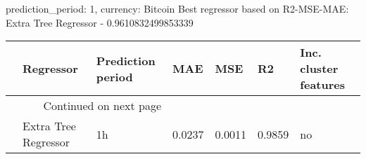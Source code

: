 
prediction_period: 1, currency: Bitcoin
Best regressor based on R2-MSE-MAE: Extra Tree Regressor - 0.9610832499853339
\begin{longtable}{lllllll}
\toprule
{} &             Regressor & Prediction period &     MAE &     MSE &      R2 & Inc. cluster features \\
\midrule
\endhead
\midrule
\multicolumn{3}{r}{{Continued on next page}} \\
\midrule
\endfoot

\bottomrule
\endlastfoot
0 &  Extra Tree Regressor &                1h &  0.0237 &  0.0011 &  0.9859 &                    no \\
\end{longtable}
